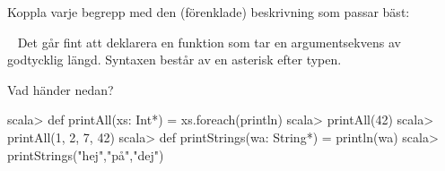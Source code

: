 

\ifPreSolution


\Exercise{\ExeWeekSIX}\label{exe:W06}

\begin{Goals}

\end{Goals}

\begin{Preparations}
\item {}
\end{Preparations}

\else

\ExerciseSolution{\ExeWeekSIX}

\fi


\BasicTasks %




\QUESTBEGIN

\Task \what

\vspace{1em}\noindent Koppla varje begrepp med den (förenklade) beskrivning som passar bäst:

\begin{ConceptConnections}

\end{ConceptConnections}

\SOLUTION

\TaskSolved \what

\begin{ConceptConnections}

\end{ConceptConnections}

\QUESTEND






\QUESTBEGIN

\Task  \what~  Det går fint att deklarera en funktion som tar en argumentsekvens av godtycklig längd. Syntaxen består av en asterisk \code{*} efter typen.

\Subtask Vad händer nedan?
\begin{REPL}
scala> def printAll(xs: Int*) = xs.foreach(println)
scala> printAll(42)
scala> printAll(1, 2, 7, 42)
scala> def printStrings(wa: String*) = println(wa)
scala> printStrings("hej","på","dej")
\end{REPL}

